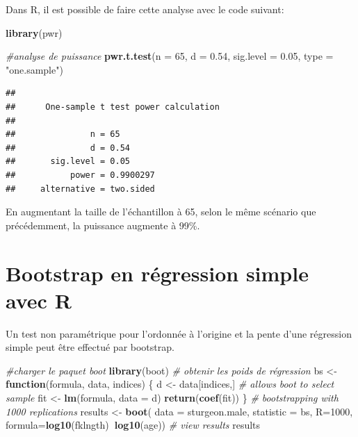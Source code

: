 \documentclass[12pt,]{book}
\newenvironment{Shaded}{\begin{snugshade}}{\end{snugshade}}
\newcommand{\CommentTok}[1]{\textcolor[rgb]{0.37,0.37,0.37}{\textit{#1}}}
\newcommand{\ControlFlowTok}[1]{\textcolor[rgb]{0.27,0.27,0.27}{\textbf{#1}}}
\newcommand{\DataTypeTok}[1]{\textcolor[rgb]{0.27,0.27,0.27}{#1}}
\newcommand{\DecValTok}[1]{\textcolor[rgb]{0.06,0.06,0.06}{#1}}
\newcommand{\FloatTok}[1]{\textcolor[rgb]{0.06,0.06,0.06}{#1}}
\newcommand{\KeywordTok}[1]{\textcolor[rgb]{0.27,0.27,0.27}{\textbf{#1}}}
\newcommand{\NormalTok}[1]{#1}
\newcommand{\OperatorTok}[1]{\textcolor[rgb]{0.43,0.43,0.43}{\textbf{#1}}}
\newcommand{\StringTok}[1]{\textcolor[rgb]{0.5,0.5,0.5}{#1}}
\begin{document}
Dans R, il est possible de faire cette analyse avec le code suivant:

\begin{Shaded}
\begin{Highlighting}[]
\KeywordTok{library}\NormalTok{(pwr)}

\CommentTok{#analyse de puissance}
\KeywordTok{pwr.t.test}\NormalTok{(}\DataTypeTok{n =} \DecValTok{65}\NormalTok{, }\DataTypeTok{d =} \FloatTok{0.54}\NormalTok{, }\DataTypeTok{sig.level =} \FloatTok{0.05}\NormalTok{, }\DataTypeTok{type =} \StringTok{"one.sample"}\NormalTok{)}
\end{Highlighting}
\end{Shaded}

\begin{verbatim}
## 
##      One-sample t test power calculation 
## 
##               n = 65
##               d = 0.54
##       sig.level = 0.05
##           power = 0.9900297
##     alternative = two.sided
\end{verbatim}

En augmentant la taille de l'échantillon à 65, selon le même scénario que précédemment, la puissance augmente à 99\%.

\hypertarget{bootstrap-en-ruxe9gression-simple-avec-r}{%
\section{Bootstrap en régression simple avec R}\label{bootstrap-en-ruxe9gression-simple-avec-r}}

Un test non paramétrique pour l'ordonnée à l'origine et la pente d'une régression simple peut être effectué par bootstrap.

\begin{Shaded}
\begin{Highlighting}[]
\CommentTok{#charger le paquet boot}
\KeywordTok{library}\NormalTok{(boot)}
\CommentTok{# obtenir les poids de régression}
\NormalTok{bs <-}\StringTok{ }\ControlFlowTok{function}\NormalTok{(formula, data, indices) \{}
\NormalTok{  d <-}\StringTok{ }\NormalTok{data[indices,] }\CommentTok{# allows boot to select sample}
\NormalTok{  fit <-}\StringTok{ }\KeywordTok{lm}\NormalTok{(formula, }\DataTypeTok{data =}\NormalTok{ d)}
  \KeywordTok{return}\NormalTok{(}\KeywordTok{coef}\NormalTok{(fit))}
\NormalTok{\}}
\CommentTok{# bootstrapping with 1000 replications}
\NormalTok{results <-}\StringTok{ }\KeywordTok{boot}\NormalTok{(}
  \DataTypeTok{data =}\NormalTok{ sturgeon.male,}
  \DataTypeTok{statistic =}\NormalTok{ bs,}
  \DataTypeTok{R=}\DecValTok{1000}\NormalTok{, }\DataTypeTok{formula=}\KeywordTok{log10}\NormalTok{(fklngth)}\OperatorTok{~}\KeywordTok{log10}\NormalTok{(age))}
\CommentTok{# view results}
\NormalTok{results}
\end{Highlighting}
\end{Shaded}
\end{document}
